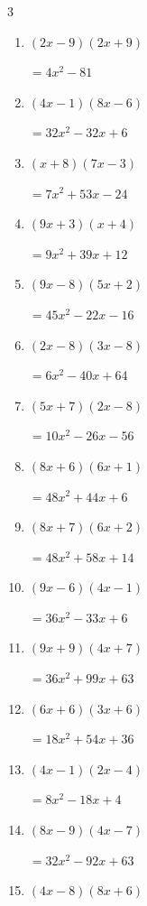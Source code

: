 \begin{multicols}{3}
\begin{enumerate}
        $=28x^{2}-13x-5$

\columnbreak %

  \item $(2x-9)(2x+9)$

        $=4x^{2}-81$

  \item $(4x-1)(8x-6)$

        $=32x^{2}-32x+6$

  \item $(x+8)(7x-3)$

        $=7x^{2}+53x-24$

  \item $(9x+3)(x+4)$

        $=9x^{2}+39x+12$

  \item $(9x-8)(5x+2)$

        $=45x^{2}-22x-16$

  \item $(2x-8)(3x-8)$

        $=6x^{2}-40x+64$

  \item $(5x+7)(2x-8)$

        $=10x^{2}-26x-56$

  \item $(8x+6)(6x+1)$

        $=48x^{2}+44x+6$

  \item $(8x+7)(6x+2)$

        $=48x^{2}+58x+14$

  \item $(9x-6)(4x-1)$

        $=36x^{2}-33x+6$

  \item $(9x+9)(4x+7)$

        $=36x^{2}+99x+63$

  \item $(6x+6)(3x+6)$

        $=18x^{2}+54x+36$

  \item $(4x-1)(2x-4)$

        $=8x^{2}-18x+4$

  \item $(8x-9)(4x-7)$

        $=32x^{2}-92x+63$

  \item $(4x-8)(8x+6)$


\end{enumerate}
\end{multicols}

